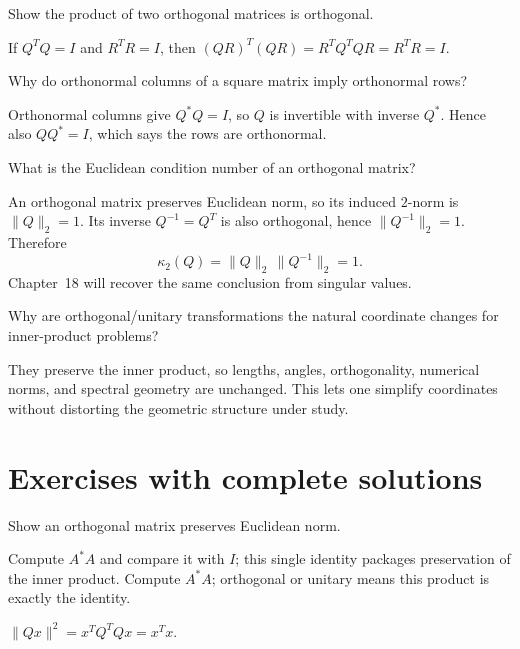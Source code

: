 \begin{problem}\label{prob:i15-problem-09}
Show the product of two orthogonal matrices is orthogonal.
\end{problem}
\begin{solution}
If $Q^TQ=I$ and $R^TR=I$, then $(QR)^T(QR)=R^TQ^TQR=R^TR=I$.
\end{solution}

\begin{problem}\label{prob:i15-problem-10}
Why do orthonormal columns of a square matrix imply orthonormal rows?
\end{problem}
\begin{solution}
Orthonormal columns give $Q^*Q=I$, so $Q$ is invertible with inverse $Q^*$. Hence also $QQ^*=I$, which says the rows are orthonormal.
\end{solution}

\begin{problem}\label{prob:i15-problem-11}
What is the Euclidean condition number of an orthogonal matrix?
\end{problem}
\begin{solution}
An orthogonal matrix preserves Euclidean norm, so its induced $2$-norm is $\|Q\|_2=1$. Its inverse $Q^{-1}=Q^T$ is also orthogonal, hence $\|Q^{-1}\|_2=1$. Therefore
\[
\kappa_2(Q)=\|Q\|_2\,\|Q^{-1}\|_2=1.
\]
Chapter~18 will recover the same conclusion from singular values.
\end{solution}

\begin{problem}\label{prob:i15-problem-12}
Why are orthogonal/unitary transformations the natural coordinate changes for inner-product problems?
\end{problem}
\begin{solution}
They preserve the inner product, so lengths, angles, orthogonality, numerical norms, and spectral geometry are unchanged. This lets one simplify coordinates without distorting the geometric structure under study.
\end{solution}


\section{Exercises with complete solutions}

\begin{exercise}\label{exr:i15-01}
Show an orthogonal matrix preserves Euclidean norm.
\end{exercise}
\begin{hint}
Compute \(A^*A\) and compare it with \(I\); this single identity packages preservation of the inner product. Compute \(A^*A\); orthogonal or unitary means this product is exactly the identity.
\end{hint}
\begin{solution}
$\|Qx\|^2=x^TQ^TQx=x^Tx$.
\end{solution}

